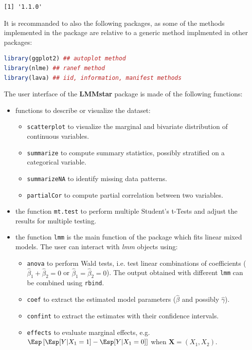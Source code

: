 \documentclass[12pt]{article}
\newcommand{\VX}{\boldsymbol{X}}
\begin{document}
\label{}
\begin{verbatim}
[1] '1.1.0'
\end{verbatim}


It is recommanded to also the following packages, as some of the
methods implemented in the package are relative to a generic method
implmented in other packages:
\begin{lstlisting}[language=r,numbers=none]
library(ggplot2) ## autoplot method
library(nlme) ## ranef method
library(lava) ## iid, information, manifest methods
\end{lstlisting}

\clearpage

The user interface of the \textbf{LMMstar} package is made of the following
functions:
\begin{itemize}
\item functions to describe or visualize the dataset: 
\begin{itemize}
\item \texttt{scatterplot} to visualize the marginal and bivariate distribution of continuous variables.
\item \texttt{summarize} to compute summary statistics, possibly stratified on a categorical variable.
\item \texttt{summarizeNA} to identify missing data patterns.
\item \texttt{partialCor} to compute partial correlation between two variables.
\end{itemize}
\item the function \texttt{mt.test} to perform multiple Student's t-Tests and
adjust the results for multiple testing.
\item the function \texttt{lmm} is the main function of the package which fits
linear mixed models. The user can interact with \emph{lmm} objects using:
\begin{itemize}
\item \texttt{anova} to perform Wald tests, i.e. test linear combinations of
coefficients (\(\widehat{\beta}_1+\widehat{\beta}_2=0\) or
\(\widehat{\beta}_1=\widehat{\beta}_2=0\)). The output obtained
with different \texttt{lmm} can be combined using \texttt{rbind}.
\item \texttt{coef} to extract the estimated model parameters (\(\widehat{\beta}\) and possibly \(\widehat{\gamma}\)).
\item \texttt{confint} to extract the estimates with their confidence intervals.
\item \texttt{effects} to evaluate marginal effects, e.g. \(\Esp\left[\Esp[Y|X_1=1]-\Esp[Y|X_1=0]\right]\) when \(\VX=(X_1,X_2)\).

\end{itemize}
\end{itemize}
\end{document}
